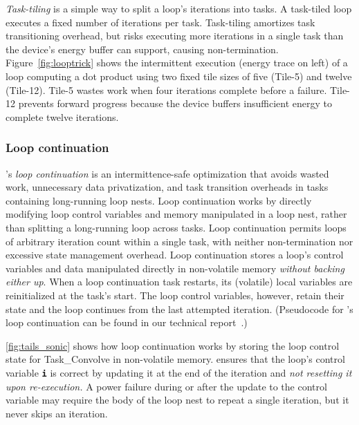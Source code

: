 \figSONICCompDesigns

{\em Task-tiling} is a simple way to split a loop's iterations into tasks.  A
task-tiled loop executes a fixed number of iterations per task.  Task-tiling
amortizes task transitioning overhead, but risks executing more iterations in a
single task than the device's energy buffer can support, causing
non-termination.  Figure~\ref{fig:looptrick} shows the intermittent execution
(energy trace on left) of a loop computing a dot product using two
fixed tile sizes of five (Tile-5) and twelve (Tile-12). Tile-5 wastes work when four
iterations complete before a failure.  Tile-12 prevents forward
progress because the device buffers insufficient energy to complete twelve
iterations.

\subsubsection{Loop continuation}

\sonic's \emph{loop continuation} is an intermittence-safe optimization that avoids wasted work,
unnecessary data privatization, and task transition overheads in tasks
containing long-running loop nests. Loop continuation works by directly
modifying loop control variables and memory manipulated in a loop nest, rather
than splitting a long-running loop across tasks. 
%
Loop continuation
permits loops of arbitrary iteration count within a single task, with neither
non-termination nor excessive state management overhead.
%
Loop continuation stores a loop's control variables and data manipulated directly in non-volatile
memory \emph{without backing either up}.  When a loop continuation task restarts, its
(volatile) local variables are reinitialized at the task's start.  The loop
control variables, however, retain their state and the loop continues from the
last attempted iteration.
(Pseudocode for \sonic's loop continuation can be found in our technical report~\cite{sonic-arxiv}.)

\figSONICLoopContinuation

\autoref{fig:tails_sonic} shows how loop continuation
works by storing the loop control state for \textsf{Task\_Convolve} in non-volatile memory.  
%
\sonic ensures that the loop's control variable {\tt\bfseries i} is correct by updating it at the end of the iteration and \emph{not resetting it upon re-execution.}
A power failure during or after the update to
the control variable may require the body of the loop nest to repeat a single
iteration, but %
it never skips an iteration.

